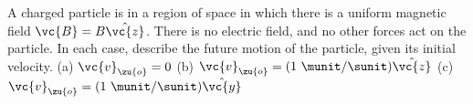 A charged particle is in a region of space in which there is a uniform magnetic
        field $\vc{B}=B\hat{\vc{z}}$. There is no electric field, and no other forces
        act on the particle. In each case, describe the future motion of the particle,
        given its initial velocity.\hwendpart
        (a) $\vc{v}_\zu{o}=0$\hwendpart
        (b) $\vc{v}_\zu{o}=(1\ \munit/\sunit)\hat{\vc{z}}$\hwendpart
        (c) $\vc{v}_\zu{o}=(1\ \munit/\sunit)\hat{\vc{y}}$
